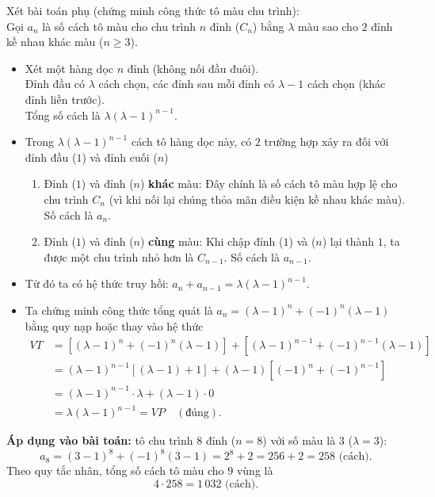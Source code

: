 \begin{ex}
{\begin{itemize}
		\end{itemize}
		Xét bài toán phụ (chứng minh công thức tô màu chu trình):\\
		Gọi $a_n$ là số cách tô màu cho chu trình $n$ đỉnh ($C_n$) bằng $\lambda$ màu sao cho $2$ đỉnh kề nhau khác màu ($n \geq 3$).
		\begin{itemize}
			\item Xét một hàng dọc $n$ đỉnh (không nối đầu đuôi).\\ Đỉnh đầu có $\lambda$ cách chọn, các đỉnh sau mỗi đỉnh có $\lambda-1$ cách chọn (khác đỉnh liền trước).\\ Tổng số cách là $\lambda(\lambda-1)^{n-1}$.
			\item Trong $\lambda(\lambda-1)^{n-1}$ cách tô hàng dọc này, có $2$ trường hợp xảy ra đối với đỉnh đầu ($1$) và đỉnh cuối ($n$)
			\begin{enumerate}
				\item Đỉnh ($1$) và đỉnh ($n$) \textbf{khác} màu: Đây chính là số cách tô màu hợp lệ cho chu trình $C_n$ (vì khi nối lại chúng thỏa mãn điều kiện kề nhau khác màu). Số cách là $a_n$.
				\item Đỉnh ($1$) và đỉnh ($n$) \textbf{cùng} màu: Khi chập đỉnh ($1$) và ($n$) lại thành $1$, ta được một chu trình nhỏ hơn là $C_{n-1}$. Số cách là $a_{n-1}$.
			\end{enumerate}
			\item Từ đó ta có hệ thức truy hồi: $a_n + a_{n-1} = \lambda(\lambda-1)^{n-1}$.
			\item Ta chứng minh công thức tổng quát là $a_n = (\lambda-1)^n + (-1)^n(\lambda-1)$ bằng quy nạp hoặc thay vào hệ thức
			\begin{align*}
				VT &= [(\lambda-1)^n + (-1)^n(\lambda-1)] + [(\lambda-1)^{n-1} + (-1)^{n-1}(\lambda-1)] \\
				&= (\lambda-1)^{n-1} [(\lambda-1) + 1] + (\lambda-1) [(-1)^n + (-1)^{n-1}] \\
				&= (\lambda-1)^{n-1} \cdot \lambda + (\lambda-1) \cdot 0 \\
				&= \lambda(\lambda-1)^{n-1} = VP \quad (\text{đúng}).
			\end{align*}
		\end{itemize}
		\textbf{Áp dụng vào bài toán:}
		tô chu trình $8$ đỉnh ($n=8$) với số màu là $3$ ($\lambda=3$):
		\[ a_8 = (3-1)^8 + (-1)^8(3-1) = 2^8 + 2 = 256 + 2 = 258 \text{ (cách)}.\]
		Theo quy tắc nhân, tổng số cách tô màu cho $9$ vùng là
		\[ 4 \cdot 258 = 1\,032 \text{ (cách)}. \]
	}
\end{ex}

